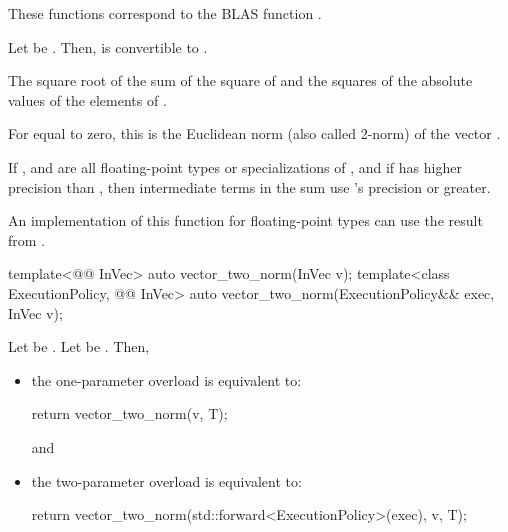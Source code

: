 \begin{itemdescr}
\pnum
\begin{note}
These functions correspond to the BLAS function .
\end{note}

\pnum
\mandates
Let  be
.
Then,  is convertible to .

\pnum
\returns
The square root of the sum of the square of  and the squares of the absolute values of the elements of .
\begin{note}
For  equal to zero, this is the Euclidean norm
(also called 2-norm) of the vector .
\end{note}

\pnum
\remarks
If , and 
are all floating-point types or specializations of ,
and if  has higher precision
than ,
then intermediate terms in the sum use 's precision or greater.
\begin{note}
An implementation of this function for floating-point types 
can use the  result from
.
\end{note}
\end{itemdescr}

\begin{itemdecl}
template<@@ InVec>
  auto vector_two_norm(InVec v);
template<class ExecutionPolicy, @@ InVec>
  auto vector_two_norm(ExecutionPolicy&& exec, InVec v);
\end{itemdecl}

\begin{itemdescr}
\pnum
\effects
Let  be
.
Let  be .
Then,
\begin{itemize}
\item
the one-parameter overload is equivalent to:
\begin{codeblock}
return vector_two_norm(v, T{});
\end{codeblock}
and
\item
the two-parameter overload is equivalent to:
\begin{codeblock}
return vector_two_norm(std::forward<ExecutionPolicy>(exec), v, T{});
\end{codeblock}
\end{itemize}
\end{itemdescr}

